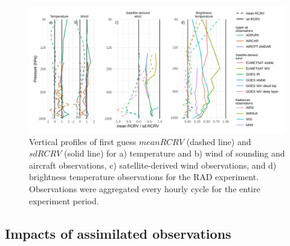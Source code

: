 \documentclass[authoryear,preprint,review,12pt]{elsarticle} %
\begin{document}
\begin{figure}
\includegraphics{../figures/rcrv-profile-1} \caption{Vertical profiles of first guess \(mean RCRV\) (dashed line) and \(sd RCRV\) (solid line) for a) temperature and b) wind of sounding and aircraft observations, c) satellite-derived wind observations, and d) brightness temperature observations for the RAD experiment. Observations were aggregated every hourly cycle for the entire experiment period.}\label{fig:rcrv-profile}
\end{figure}

\hypertarget{impacts-of-assimilated-observations}{%
\subsection{Impacts of assimilated observations}\label{impacts-of-assimilated-observations}}
\end{document}

